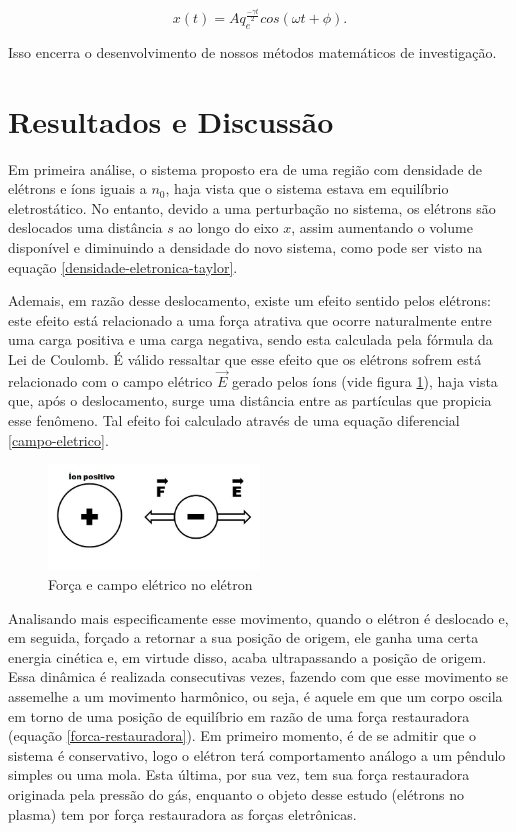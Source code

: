\documentclass[
	article,
	11pt,
	oneside,
	a4paper,
	english,
	brazil,
	sumario=tradicional
	]{abntex2}
\begin{document}
\begin{equation}
  x(t) = A q_e^{\frac{-\gamma t}{2}} cos(\omega t + \phi).
\end{equation}

\noindent Isso encerra o desenvolvimento de nossos métodos matemáticos de investigação.

\section{Resultados e Discussão}

 Em primeira análise, o sistema proposto era de uma região com densidade de elétrons e íons iguais a $n_0$, haja vista que o sistema estava em equilíbrio eletrostático. No entanto, devido a uma perturbação no sistema, os elétrons são deslocados uma distância $s$ ao longo do eixo $x$, assim aumentando o volume disponível e diminuindo a densidade do novo sistema, como pode ser visto na  equação \ref{densidade-eletronica-taylor}.

Ademais, em razão desse deslocamento, existe um efeito sentido pelos elétrons: este efeito está relacionado a uma força atrativa que ocorre naturalmente entre uma carga positiva e uma carga negativa, sendo esta calculada pela fórmula da Lei de Coulomb. É válido ressaltar que esse efeito  que os elétrons sofrem está relacionado com o campo elétrico $\vec{E}$ gerado pelos íons (vide figura \ref{forcas}), haja vista que, após o deslocamento, surge uma distância entre as partículas que propicia esse fenômeno. Tal efeito foi calculado através de uma equação diferencial \ref{campo-eletrico}.

\begin{figure}[htb]
    \caption{\label{forcas}Força e campo elétrico no elétron}
    \centering
    \includegraphics[width=0.5\textwidth]{forcas.jpeg}
\end{figure}

Analisando mais especificamente esse movimento, quando o elétron é deslocado e, em seguida, forçado a retornar a sua posição de origem, ele ganha uma certa energia cinética e, em virtude disso, acaba ultrapassando a posição de origem. Essa dinâmica é realizada consecutivas vezes, fazendo com que esse movimento se assemelhe a um movimento harmônico, ou seja, é aquele em que um corpo oscila em torno de uma posição de equilíbrio em razão de uma força restauradora (equação \ref{forca-restauradora}). Em primeiro momento, é de se admitir que o sistema é conservativo, logo o elétron terá comportamento análogo a um pêndulo simples ou uma mola. Esta última, por sua vez, tem sua força restauradora originada pela pressão do gás, enquanto o objeto desse estudo (elétrons no plasma) tem por força restauradora as forças eletrônicas.
\end{document}

